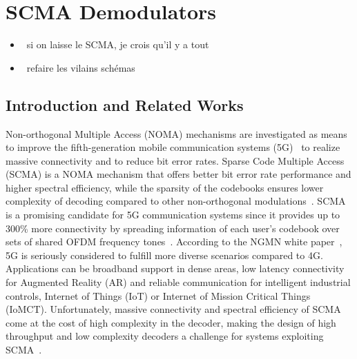 \section{SCMA Demodulators}

\begin{itemize}
  \item \cmark~si on laisse le SCMA, je crois qu'il y a tout
  \item \xmark~refaire les vilains schémas
\end{itemize}

\subsection{Introduction and Related Works}

Non-orthogonal Multiple Access (NOMA) mechanisms are investigated as means to
improve the fifth-generation mobile communication systems (5G)~\cite{Islam2017}
to realize massive connectivity and to reduce bit error rates. Sparse Code
Multiple Access (SCMA) is a NOMA mechanism that offers better bit error rate
performance and higher spectral efficiency, while the sparsity of the codebooks
ensures lower complexity of decoding compared to other non-orthogonal
modulations~\cite{Nikopour2013}. SCMA is a promising candidate for 5G
communication systems since it provides up to 300\% more connectivity by
spreading information of each user's codebook over sets of shared OFDM frequency
tones~\cite{Altera2015}. According to the NGMN white paper~\cite{Alliance2015},
5G is seriously considered to fulfill more diverse scenarios compared to 4G.
Applications can be broadband support in dense areas, low latency connectivity
for Augmented Reality (AR) and reliable communication for intelligent industrial
controls, Internet of Things (IoT) or Internet of Mission Critical Things
(IoMCT). Unfortunately, massive connectivity and spectral efficiency of SCMA
come at the cost of high complexity in the decoder, making the design of high
throughput and low complexity decoders a challenge for systems exploiting
SCMA~\cite{Lu2015}.

